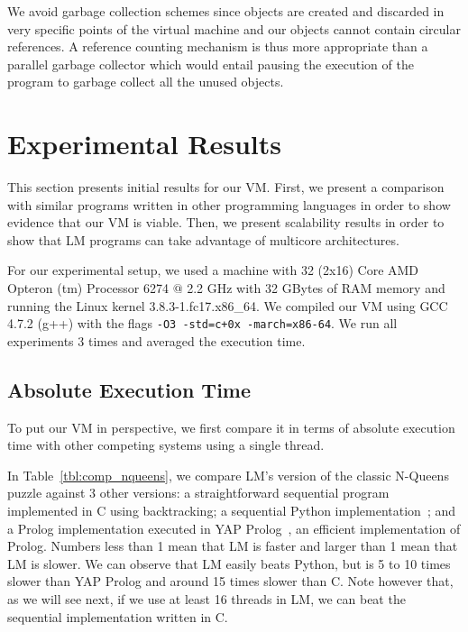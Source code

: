\documentclass{sigplanconf}
\begin{document}
We avoid garbage collection schemes since objects are created and discarded
in very specific points of the virtual machine and our objects cannot contain circular references.
A reference counting mechanism is thus more appropriate than a parallel garbage collector which
would entail pausing the execution of the program to garbage collect all the unused objects.
 
\makeatletter{}\newcommand{\plotsize}{0.45\textwidth}


\section{Experimental Results}
\label{results}

This section presents initial results for our VM. First, we present a
comparison with similar programs written in other programming
languages in order to show evidence that our VM is viable. Then, we
present scalability results in order to show that LM programs can take
advantage of multicore architectures.

For our experimental setup, we used a machine with 32 (2x16) Core AMD
Opteron (tm) Processor 6274 $@$ 2.2 GHz with 32 GBytes of RAM memory
and running the Linux kernel 3.8.3-1.fc17.x86\_64.  We compiled our VM
using GCC 4.7.2 (g++) with the flags \texttt{-O3 -std=c+0x
  -march=x86-64}. We run all experiments 3 times and averaged the
execution time.


\subsection{Absolute Execution Time}

To put our VM in perspective, we first compare it in terms of absolute
execution time with other competing systems using a single thread.

In Table~\ref{tbl:comp_nqueens}, we compare LM's version of the
classic N-Queens puzzle against 3 other versions: a straightforward
sequential program implemented in C using backtracking; a sequential
Python implementation~\cite{vanRossum:1995:PRM}; and a Prolog
implementation executed in YAP
Prolog~\cite{DBLP:journals/corr/abs-1102-3896}, an efficient
implementation of Prolog. Numbers less than 1 mean that LM is faster
and larger than 1 mean that LM is slower. We can observe that LM
easily beats Python, but is 5 to 10 times slower than YAP Prolog and
around 15 times slower than C. Note however that, as we will see next,
if we use at least 16 threads in LM, we can beat the sequential
implementation written in C.
\end{document}
